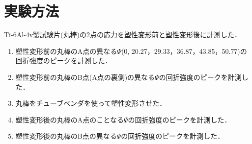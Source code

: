 \section{実験方法}
Ti-6Al-4v製試験片(丸棒)の2点の応力を塑性変形前と塑性変形後に計測した．

\begin{enumerate}
    \item 塑性変形前の丸棒のA点の異なる$\Psi$(0\textdegree, 20.27\textdegree，29.33\textdegree，36.87\textdegree，43.85\textdegree，50.77\textdegree)の回折強度のピークを計測した．
    \item 塑性変形前の丸棒のB点(A点の裏側)の異なる$\Psi$の回折強度のピークを計測した．
    \item 丸棒をチューブベンダを使って塑性変形させた．
    \item 塑性変形後の丸棒のA点のことなる$\Psi$の回折強度のピークを計測した．
    \item 塑性変形後の丸棒のB点の異なる$\Psi$の回折強度のピークを計測した．
\end{enumerate}